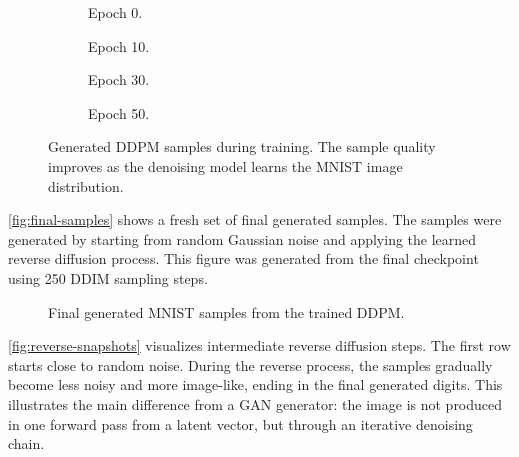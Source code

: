 \begin{figure}[H]
    \centering
    \begin{subfigure}{0.48\textwidth}
        \centering
        \caption{Epoch 0.}
    \end{subfigure}
    \hfill
    \begin{subfigure}{0.48\textwidth}
        \centering
        \caption{Epoch 10.}
    \end{subfigure}

    \vspace{0.25em}

    \begin{subfigure}{0.48\textwidth}
        \centering
        \caption{Epoch 30.}
    \end{subfigure}
    \hfill
    \begin{subfigure}{0.48\textwidth}
        \centering
        \caption{Epoch 50.}
    \end{subfigure}
    \caption{Generated DDPM samples during training. The sample quality improves as the denoising model learns the MNIST image distribution.}
    \label{fig:sample-progression}
\end{figure}
\FloatBarrier

\autoref{fig:final-samples} shows a fresh set of final generated samples.
The samples were generated by starting from random Gaussian noise and applying the learned reverse diffusion process.
This figure was generated from the final checkpoint using 250 DDIM sampling steps.

\begin{figure}[H]
    \centering
    \caption{Final generated MNIST samples from the trained DDPM.}
    \label{fig:final-samples}
\end{figure}
\FloatBarrier

\autoref{fig:reverse-snapshots} visualizes intermediate reverse diffusion steps.
The first row starts close to random noise.
During the reverse process, the samples gradually become less noisy and more image-like, ending in the final generated digits.
This illustrates the main difference from a GAN generator: the image is not produced in one forward pass from a latent vector, but through an iterative denoising chain.

